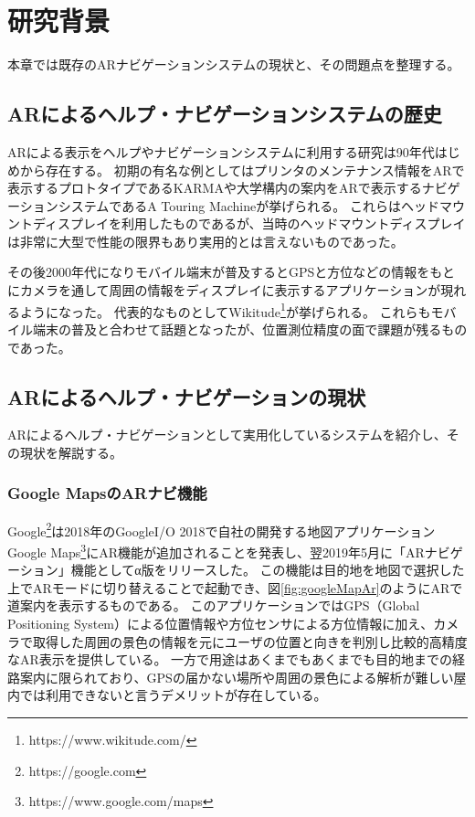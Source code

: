 \chapter{研究背景}
\label{chap:background}

本章では既存のARナビゲーションシステムの現状と、その問題点を整理する。

\newpage



\section{ARによるヘルプ・ナビゲーションシステムの歴史}
ARによる表示をヘルプやナビゲーションシステムに利用する研究は90年代はじめから存在する。
初期の有名な例としてはプリンタのメンテナンス情報をARで表示するプロトタイプであるKARMA\cite{10.1145/159544.159587}や大学構内の案内をARで表示するナビゲーションシステムであるA Touring Machine\cite{629922}が挙げられる。
これらはヘッドマウントディスプレイを利用したものであるが、当時のヘッドマウントディスプレイは非常に大型で性能の限界もあり実用的とは言えないものであった。

その後2000年代になりモバイル端末が普及するとGPSと方位などの情報をもとにカメラを通して周囲の情報をディスプレイに表示するアプリケーションが現れるようになった。
代表的なものとしてWikitude\footnote{\textsf{https://www.wikitude.com/}}が挙げられる。
これらもモバイル端末の普及と合わせて話題となったが、位置測位精度の面で課題が残るものであった。



\section{ARによるヘルプ・ナビゲーションの現状}
\label{current}
ARによるヘルプ・ナビゲーションとして実用化しているシステムを紹介し、その現状を解説する。



\subsection{Google MapsのARナビ機能}
Google\footnote{\textsf{https://google.com}}は2018年のGoogleI/O 2018で自社の開発する地図アプリケーションGoogle Maps\footnote{\textsf{https://www.google.com/maps}}にAR機能が追加されることを発表し、翌2019年5月に「ARナビゲーション」機能としてα版をリリースした。
この機能は目的地を地図で選択した上でARモードに切り替えることで起動でき、図\ref{fig:googleMapAr}のようにARで道案内を表示するものである。
このアプリケーションではGPS（Global Positioning System）による位置情報や方位センサによる方位情報に加え、カメラで取得した周囲の景色の情報を元にユーザの位置と向きを判別し比較的高精度なAR表示を提供している。
一方で用途はあくまでもあくまでも目的地までの経路案内に限られており、GPSの届かない場所や周囲の景色による解析が難しい屋内では利用できないと言うデメリットが存在している。

